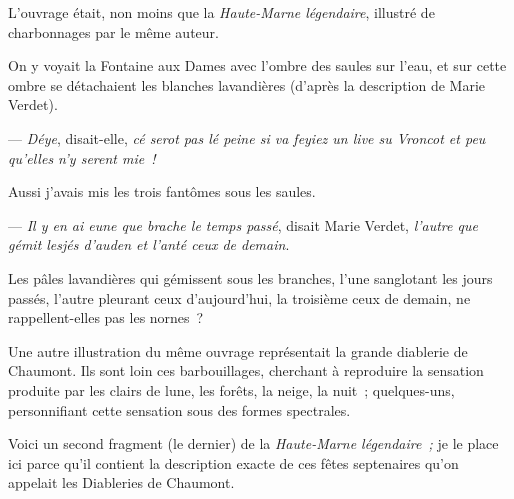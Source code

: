 \documentclass[french,twoside]{book} %
\begin{document}
\noindent L’ouvrage était, non moins que la \emph{Haute-Marne légendaire}, illustré de charbonnages par le même auteur.\par
On y voyait la Fontaine aux Dames avec l’ombre des saules sur l’eau, et sur cette ombre se détachaient les blanches lavandières (d’après la description de Marie Verdet).\par
— \emph{Déye}, disait-elle, \emph{cé serot pas lé peine si va feyiez un live su Vroncot et peu qu’elles n’y serent mie !}\par
Aussi j’avais mis les trois fantômes sous les saules.\par
— \emph{Il y en ai eune que brache le temps passé}, disait Marie Verdet, \emph{l’autre que gémit lesjés d’auden et l’anté ceux de demain}.\par
Les pâles lavandières qui gémissent sous les branches, l’une sanglotant les jours passés, l’autre pleurant ceux d’aujourd’hui, la troisième ceux de demain, ne rappellent-elles pas les nornes ?\par
 Une autre illustration du même ouvrage représentait la grande diablerie de Chaumont. Ils sont loin ces barbouillages, cherchant à reproduire la sensation produite par les clairs de lune, les forêts, la neige, la nuit ; quelques-uns, personnifiant cette sensation sous des formes spectrales.\par
Voici un second fragment (le dernier) de la \emph{Haute-Marne légendaire ;} je le place ici parce qu’il contient la description exacte de ces fêtes septenaires qu’on appelait les Diableries de Chaumont.\par
\end{document}
